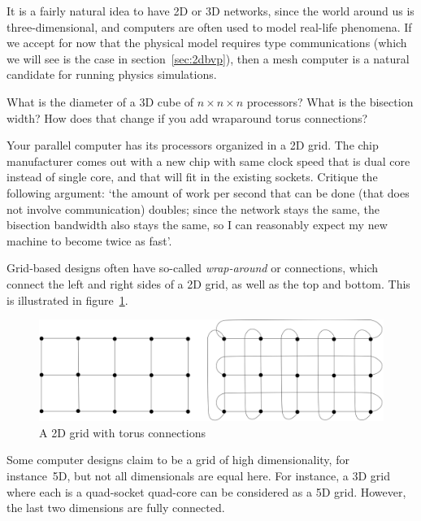It is a fairly natural idea to have 2D or 3D networks, since the world
around us is three-dimensional, and computers are often used to model
real-life phenomena. If we accept for now that the physical model
requires  type communications (which we
will see is the case in section~\ref{sec:2dbvp}), then a mesh computer
is a natural candidate for running physics simulations.

\begin{exercise}
  What is the diameter of a 3D cube of $n\times n\times n$ processors? What is the
  bisection width? How does that change if you add wraparound torus
  connections?
\end{exercise}

\begin{exercise}
  Your parallel computer has its processors organized in a 2D grid.
  The chip manufacturer comes out with a new chip with same clock
  speed that is dual core instead of single core, and that will fit in
  the existing sockets. Critique the following argument: `the amount of
  work per second that can be done (that does not involve communication)
  doubles; since the network stays the same, the bisection bandwidth
  also stays the same, so I can reasonably expect my new machine to
  become twice as fast'.
\end{exercise}

Grid-based designs often have so-called \emph{wrap-around} or
 connections, which connect the left and right sides
of a 2D grid, as well as the top and bottom. This is illustrated in
figure~\ref{fig:torus}.
\begin{figure}[th]
  \includegraphics[scale=.11]{graphics/torus}
  \caption{A 2D grid with torus connections}
  \label{fig:torus}
\end{figure}

Some computer designs claim to be a grid of high dimensionality, for
instance~5D, but not all dimensionals are equal here. For instance, a 3D
grid where each  is a quad-socket 
quad-core can be considered as a
5D grid. However, the last two dimensions are fully connected.

